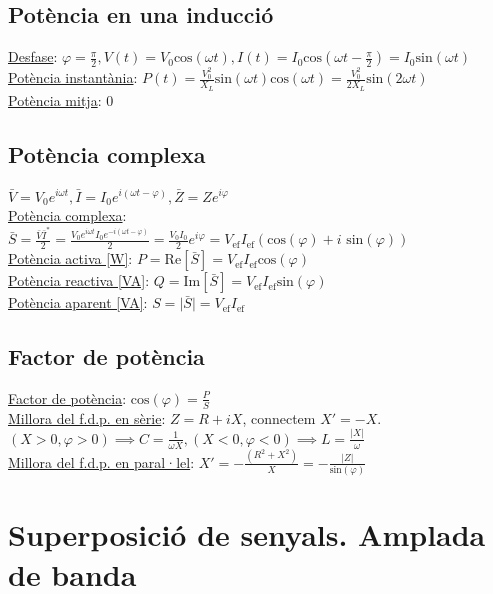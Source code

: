 \documentclass[12pt]{article}
\begin{document}
\begin{multicols}{4}
\subsection{Potència en una inducció}

\underline{Desfase}: $\varphi = \frac{\pi}{2}, V(t) = V_0\text{cos}(\omega t), I(t) = I_0\text{cos}(\omega t - \frac{\pi}{2}) = I_0\text{sin}(\omega t)$ \\
\underline{Potència instantània}: $P(t) = \frac{V_0^2}{X_L}\text{sin}(\omega t)\text{cos}(\omega t) = \frac{V_0^2}{2X_L}\text{sin}(2\omega t)$ \\
\underline{Potència mitja}: 0

\subsection{Potència complexa}

$\bar{V} = V_0e^{i\omega t}, \bar{I} = I_0e^{i(\omega t - \varphi)}, \bar{Z} = Z e^{i\varphi}$ \\
\underline{Potència complexa}: $\bar{S} = \frac{\bar{V}\bar{I}^*}{2} = \frac{V_0e^{i\omega t}I_0e^{-i(\omega t - \varphi)}}{2} = \frac{V_0I_0}{2}e^{i\varphi} = V_{\text{ef}}I_{\text{ef}}(\text{cos}(\varphi) + i\text{ sin}(\varphi))$ \\
\underline{Potència activa [W]}: $P = \text{Re}[\bar{S}] = V_{\text{ef}}I_{\text{ef}}\text{cos}(\varphi)$ \\
\underline{Potència reactiva [VA]}: $Q = \text{Im}[\bar{S}] = V_{\text{ef}}I_{\text{ef}}\text{sin}(\varphi)$ \\
\underline{Potència aparent [VA]}: $S = \vert \bar{S} \vert = V_{\text{ef}}I_{\text{ef}}$

\subsection{Factor de potència}

\underline{Factor de potència}: $\text{cos}(\varphi) = \frac{P}{S}$ \\
\underline{Millora del f.d.p. en sèrie}: $Z = R + iX$, connectem $X' = -X$. $(X>0,\varphi>0) \implies C=\frac{1}{\omega X}, (X<0, \varphi<0) \implies L=\frac{\vert X\vert}{\omega}$ \\
\underline{Millora del f.d.p. en paral·lel}: $X' = -\frac{(R^2+X^2)}{X} = -\frac{\vert Z\vert}{\text{sin}(\varphi)}$

\section{Superposició de senyals. Amplada de banda}


\end{multicols}
\end{document}
